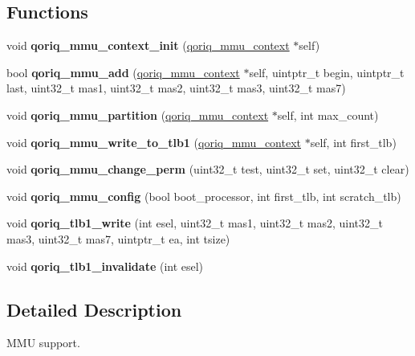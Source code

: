 \subsection*{Functions}
\begin{DoxyCompactItemize}
\item 
\mbox{\label{group__QorIQMMU_gac78c2170cc72243dc52f97a591d1815c}} 
void {\bfseries qoriq\+\_\+mmu\+\_\+context\+\_\+init} (\mbox{\hyperlink{structqoriq__mmu__context}{qoriq\+\_\+mmu\+\_\+context}} $\ast$self)
\item 
\mbox{\label{group__QorIQMMU_ga44734086ef1dcd7f81d33a1b29dcb1a1}} 
bool {\bfseries qoriq\+\_\+mmu\+\_\+add} (\mbox{\hyperlink{structqoriq__mmu__context}{qoriq\+\_\+mmu\+\_\+context}} $\ast$self, uintptr\+\_\+t begin, uintptr\+\_\+t last, uint32\+\_\+t mas1, uint32\+\_\+t mas2, uint32\+\_\+t mas3, uint32\+\_\+t mas7)
\item 
\mbox{\label{group__QorIQMMU_ga9a5c4539272d06840d46b3742c312c16}} 
void {\bfseries qoriq\+\_\+mmu\+\_\+partition} (\mbox{\hyperlink{structqoriq__mmu__context}{qoriq\+\_\+mmu\+\_\+context}} $\ast$self, int max\+\_\+count)
\item 
\mbox{\label{group__QorIQMMU_ga9e227b7cbeb146ea0292eb7e41747f38}} 
void {\bfseries qoriq\+\_\+mmu\+\_\+write\+\_\+to\+\_\+tlb1} (\mbox{\hyperlink{structqoriq__mmu__context}{qoriq\+\_\+mmu\+\_\+context}} $\ast$self, int first\+\_\+tlb)
\item 
\mbox{\label{group__QorIQMMU_ga2794666c7f1d925238116bdc85d89587}} 
void {\bfseries qoriq\+\_\+mmu\+\_\+change\+\_\+perm} (uint32\+\_\+t test, uint32\+\_\+t set, uint32\+\_\+t clear)
\item 
\mbox{\label{group__QorIQMMU_gabd578e7956fb6ed301e94b8737118a6d}} 
void {\bfseries qoriq\+\_\+mmu\+\_\+config} (bool boot\+\_\+processor, int first\+\_\+tlb, int scratch\+\_\+tlb)
\item 
\mbox{\label{group__QorIQMMU_ga1e78bffb42f33d8c3c34f97ec82a2873}} 
void {\bfseries qoriq\+\_\+tlb1\+\_\+write} (int esel, uint32\+\_\+t mas1, uint32\+\_\+t mas2, uint32\+\_\+t mas3, uint32\+\_\+t mas7, uintptr\+\_\+t ea, int tsize)
\item 
\mbox{\label{group__QorIQMMU_gae2d37e302db068f6f0c223ee4ba9420b}} 
void {\bfseries qoriq\+\_\+tlb1\+\_\+invalidate} (int esel)
\end{DoxyCompactItemize}


\subsection{Detailed Description}
M\+MU support. 

